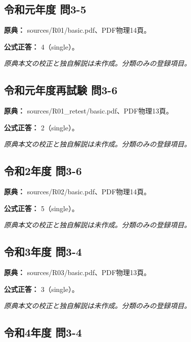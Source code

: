 \subsection{令和元年度 問3-5}
\label{q:r01-reg-basic-3-5}

\noindent\textbf{原典：} sources/R01/basic.pdf、PDF物理14頁。

\textbf{公式正答：} 4（single）。

\par\textit{原典本文の校正と独自解説は未作成。分類のみの登録項目。}

\subsection{令和元年度再試験 問3-6}
\label{q:r01-ret-basic-3-6}

\noindent\textbf{原典：} sources/R01\_retest/basic.pdf、PDF物理13頁。

\textbf{公式正答：} 2（single）。

\par\textit{原典本文の校正と独自解説は未作成。分類のみの登録項目。}

\subsection{令和2年度 問3-6}
\label{q:r02-reg-basic-3-6}

\noindent\textbf{原典：} sources/R02/basic.pdf、PDF物理14頁。

\textbf{公式正答：} 5（single）。

\par\textit{原典本文の校正と独自解説は未作成。分類のみの登録項目。}

\subsection{令和3年度 問3-4}
\label{q:r03-reg-basic-3-4}

\noindent\textbf{原典：} sources/R03/basic.pdf、PDF物理13頁。

\textbf{公式正答：} 3（single）。

\par\textit{原典本文の校正と独自解説は未作成。分類のみの登録項目。}

\subsection{令和4年度 問3-4}
\label{q:r04-reg-basic-3-4}

